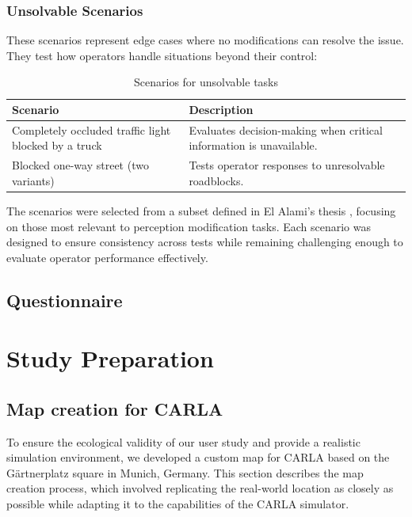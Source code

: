 \subsubsection{Unsolvable Scenarios}
These scenarios represent edge cases where no modifications can resolve the issue. They test how operators handle situations beyond their control:

\begin{table}[h!]
    \centering
    \begin{tabular}{|p{6cm}|p{7.8cm}|}
    \hline
    \textbf{Scenario} & \textbf{Description} \\
    \hline
    Completely occluded traffic light blocked by a truck & Evaluates decision-making when critical information is unavailable. \\ \hline
    Blocked one-way street (two variants) & Tests operator responses to unresolvable roadblocks. \\ \hline
    \end{tabular}
    \caption{Scenarios for unsolvable tasks}
    \label{table:scenariosunsolvable}
    \end{table}

The scenarios were selected from a subset defined in El Alami's thesis \cite{yassinethesis}, focusing on those most relevant to perception modification tasks. Each scenario was designed to ensure consistency across tests while remaining challenging enough to evaluate operator performance effectively.

\subsection{Questionnaire}

\section{Study Preparation}

\subsection{Map creation for CARLA}\label{section:mapcreationforcarla}
To ensure the ecological validity of our user study and provide a realistic simulation environment, we developed a custom map for CARLA based on the Gärtnerplatz square in Munich, Germany. This section describes the map creation process, which involved replicating the real-world location as closely as possible while adapting it to the capabilities of the CARLA simulator.
